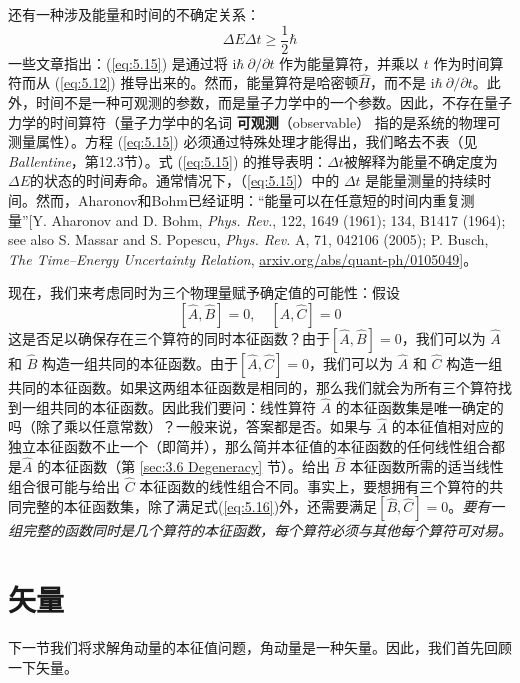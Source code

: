     还有一种涉及能量和时间的不确定关系：
    \begin{equation}
        \Delta E \Delta t \ge \frac{1}{2}\hbar
        \label{eq:5.15}
    \end{equation}
    一些文章指出：(\ref{eq:5.15}) 是通过将 $\mathrm{i}\hbar \: \partial /\partial t$ 作为能量算符，并乘以 $t$ 作为时间算符而从 (\ref{eq:5.12}) 推导出来的。然而，能量算符是哈密顿$\hat{H}$，而不是 $\mathrm{i}\hbar \: \partial /\partial t$。此外，时间不是一种可观测的参数，而是量子力学中的一个参数。因此，不存在量子力学的时间算符（量子力学中的名词 \textbf{可观测}（observable） 指的是系统的物理可测量属性）。方程 (\ref{eq:5.15}) 必须通过特殊处理才能得出，我们略去不表（见 \textit{Ballentine}，第12.3节）。式 (\ref{eq:5.15}) 的推导表明：$\Delta t$被解释为能量不确定度为$\Delta E$的状态的时间寿命。通常情况下，（\ref{eq:5.15}）中的 $\Delta t$ 是能量测量的持续时间。然而，Aharonov和Bohm已经证明：“能量可以在任意短的时间内重复测量”[Y. Aharonov and D. Bohm, \textit{Phys. Rev.}, 122, 1649 (1961); 134, B1417 (1964); see also S. Massar and S. Popescu, \textit{Phys. Rev.} A, 71, 042106 (2005); P. Busch, \textit{The Time–Energy Uncertainty Relation}, \url{arxiv.org/abs/quant-ph/0105049}]。

    现在，我们来考虑同时为三个物理量赋予确定值的可能性：假设
    \begin{equation}
        \left[\hat{A},\hat{B}\right] = 0, \quad \left[\hat{A},\hat{C}\right] = 0
        \label{eq:5.16}
    \end{equation}
    这是否足以确保存在三个算符的同时本征函数？由于$\left[\hat{A},\hat{B}\right] = 0$，我们可以为 $\hat{A}$ 和 $\hat{B}$ 构造一组共同的本征函数。由于$\left[\hat{A},\hat{C}\right] = 0$，我们可以为 $\hat{A}$ 和 $\hat{C}$ 构造一组共同的本征函数。如果这两组本征函数是相同的，那么我们就会为所有三个算符找到一组共同的本征函数。因此我们要问：线性算符 $\hat{A}$ 的本征函数集是唯一确定的吗（除了乘以任意常数）？一般来说，答案都是否。如果与 $\hat{A}$ 的本征值相对应的独立本征函数不止一个（即简并），那么简并本征值的本征函数的任何线性组合都是$\hat{A}$ 的本征函数（第 \ref{sec:3.6 Degeneracy} 节）。给出 $\hat{B}$ 本征函数所需的适当线性组合很可能与给出 $\hat{C}$ 本征函数的线性组合不同。事实上，要想拥有三个算符的共同完整的本征函数集，除了满足式(\ref{eq:5.16})外，还需要满足$\left[\hat{B},\hat{C}\right] = 0$。\textit{要有一组完整的函数同时是几个算符的本征函数，每个算符必须与其他每个算符可对易。}

\section{矢量}
\label{sec:5.2 Vectors}
    下一节我们将求解角动量的本征值问题，角动量是一种矢量。因此，我们首先回顾一下矢量。


